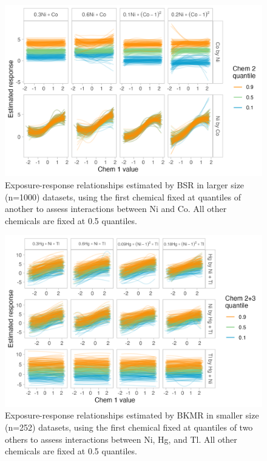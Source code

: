\documentclass[12pt, twoside]{amherstthesis}
\begin{document}
\begin{figure}

{\centering \includegraphics[width=0.8\linewidth]{figures/ch4_slg_biv_expresp_3} 

}

\caption{Exposure-response relationships estimated by BSR in larger size (n=1000) datasets, using the first chemical fixed at quantiles of another to assess interactions between Ni and Co. All other chemicals are fixed at 0.5 quantiles.}\label{fig:slgnico}
\end{figure}
\begin{figure}

{\centering \includegraphics[width=0.8\linewidth]{figures/ch4_ksm_triv_expresp} 

}

\caption{Exposure-response relationships estimated by BKMR in smaller size (n=252) datasets, using the first chemical fixed at quantiles of two others to assess interactions between Ni, Hg, and Tl. All other chemicals are fixed at 0.5 quantiles.}\label{fig:ksmtri}
\end{figure}
\end{document}
